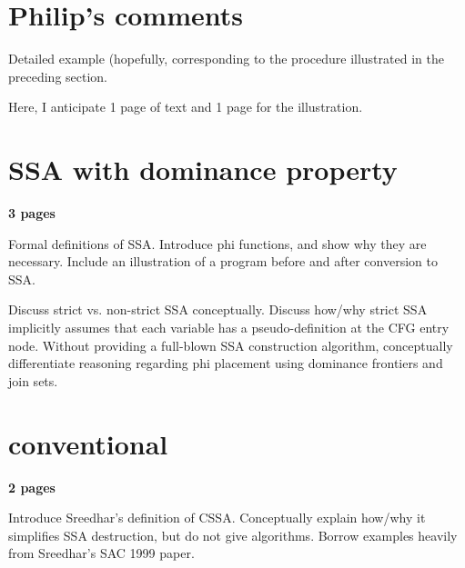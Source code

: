 \section{Philip's comments}

Detailed example (hopefully, corresponding to
the procedure illustrated in the preceding 
section. 

Here, I anticipate 1 page of text and 1 page
for the illustration.

\section{SSA with dominance property}

\textbf{3 pages}

Formal definitions of SSA. Introduce
phi functions, and show why they are
necessary. Include an illustration of
a program before and after conversion to SSA.

Discuss strict vs. non-strict SSA conceptually.
Discuss how/why strict SSA implicitly assumes
that each variable has a pseudo-definition at
the CFG entry node. Without providing a full-blown
SSA construction algorithm, conceptually differentiate
reasoning regarding phi placement using dominance 
frontiers and join sets. 


\section{conventional}

\textbf{2 pages}

Introduce Sreedhar's definition of CSSA. Conceptually
explain how/why it simplifies SSA destruction, but do
not give algorithms. Borrow examples heavily from
Sreedhar's SAC 1999 paper.
